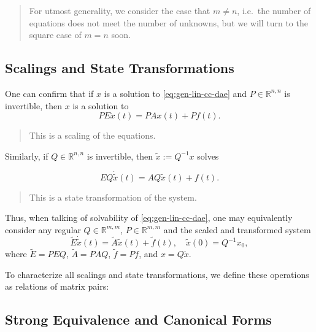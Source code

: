 \documentclass[]{book}
\newenvironment {JHSAYS} [0] {\begin{quote}\color{jhsc}} {\end{quote}}
\theoremstyle{definition}
\theoremstyle{definition}
\theoremstyle{definition}
\theoremstyle{remark}
\begin{document}
\begin{JHSAYS}
For utmost generality, we consider the case that \(m\neq n\), i.e.~the
number of equations does not meet the number of unknowns, but we will
turn to the square case of \(m=n\) soon.
\end{JHSAYS}

\hypertarget{scalings-and-state-transformations}{%
\subsection{Scalings and State Transformations}\label{scalings-and-state-transformations}}

One can confirm that if \(x\) is a solution to \eqref{eq:gen-lin-cc-dae} and \(P\in \mathbb R^{n,n}\) is invertible, then \(x\) is a solution to
\begin{equation*}
PE \dot x (t) = PAx(t) + Pf(t).
\end{equation*}

\begin{JHSAYS}
This is a scaling of the equations.
\end{JHSAYS}

Similarly, if \(Q\in \mathbb R^{n,n}\) is invertible, then \(\tilde x := Q^{-1}x\) solves

\begin{equation*}
E Q \dot {\tilde x} (t) = AQ \tilde x(t) + f(t).
\end{equation*}

\begin{JHSAYS}
This is a state transformation of the system.
\end{JHSAYS}

Thus, when talking of solvability of \eqref{eq:gen-lin-cc-dae}, one may equivalently consider any regular \(Q\in \mathbb R^{m,m}\), \(P\in \mathbb R^{m,m}\) and the scaled and transformed system
\begin{equation}
\tilde E \dot{\tilde x}(t) = \tilde A \tilde x (t) + \tilde f(t), \quad \tilde x(0) = Q^{-1}x_0,
\end{equation}
where \(\tilde E = PEQ\), \(\tilde A = PAQ\), \(\tilde f = Pf\), and \(x=Q\tilde x\).

To characterize all scalings and state transformations, we define these operations as relations of matrix pairs:

\hypertarget{strong-equivalence-and-canonical-forms}{%
\subsection{Strong Equivalence and Canonical Forms}\label{strong-equivalence-and-canonical-forms}}
\end{document}
